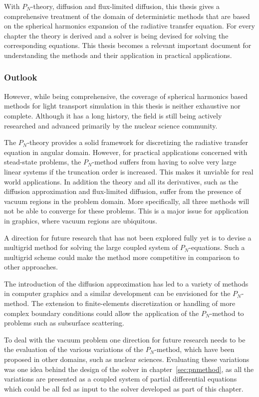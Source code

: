 With $P_N$-theory, diffusion and flux-limited diffusion, this thesis gives a comprehensive treatment of the domain of deterministic methods that are based on the spherical harmonics expansion of the radiative transfer equation. For every chapter the theory is derived and a solver is being devised for solving the corresponding equations. This thesis becomes a relevant important document for understanding the methods and their application in practical applications.

\subsubsection*{Outlook}

However, while being comprehensive, the coverage of spherical harmonics based methods for light transport simulation in this thesis is neither exhaustive nor complete. Although it has a long history, the field is still being actively researched and advanced primarily by the nuclear science community.

The $P_N$-theory provides a solid framework for discretizing the radiative transfer equation in angular domain. However, for practical applications concerned with stead-state problems, the $P_N$-method suffers from having to solve very large linear systems if the truncation order is increased. This makes it unviable for real world applications. In addition the theory and all its derivatives, such as the diffusion approximation and flux-limited diffusion, suffer from the presence of vacuum regions in the problem domain. More specifically, all three methods will not be able to converge for these problems. This is a major issue for application in graphics, where vacuum regions are ubiquitous.

A direction for future research that has not been explored fully yet is to devise a multigrid method for solving the large coupled system of $P_N$-equations. Such a multigrid scheme could make the method more competitive in comparison to other approaches.

The introduction of the diffusion approximation has led to a variety of methods in computer graphics and a similar development can be envisioned for the $P_N$-method. The extension to finite-elements discretization or handling of more complex boundary conditions could allow the application of the $P_N$-method to problems such as subsurface scattering.

To deal with the vacuum problem one direction for future research needs to be the evaluation of the various variations of the $P_N$-method, which have been proposed in other domains, such as nuclear sciences. Evaluating these variations was one idea behind the design of the solver in chapter~\ref{sec:pnmethod}, as all the variations are presented as a coupled system of partial differential equations which could be all fed as input to the solver developed as part of this chapter.

